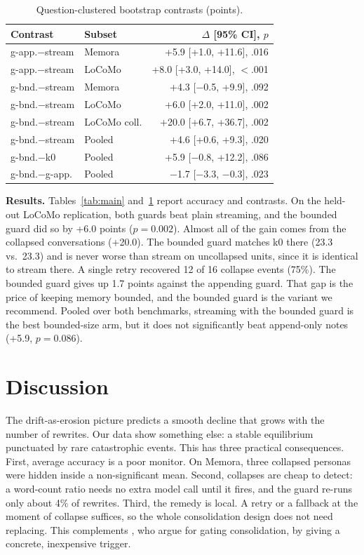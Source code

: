 \documentclass[11pt]{article}
\begin{document}
\begin{table}[t]
\centering\small
\setlength{\tabcolsep}{3pt}
\begin{tabular}{llr}
\toprule
Contrast & Subset & $\Delta$ [95\% CI], $p$ \\
\midrule
g-app.$-$stream & Memora & +5.9 [+1.0, +11.6], .016 \\
g-app.$-$stream & LoCoMo & +8.0 [+3.0, +14.0], $<$.001 \\
g-bnd.$-$stream & Memora & +4.3 [$-$0.5, +9.9], .092 \\
g-bnd.$-$stream & LoCoMo & +6.0 [+2.0, +11.0], .002 \\
g-bnd.$-$stream & LoCoMo coll. & +20.0 [+6.7, +36.7], .002 \\
g-bnd.$-$stream & Pooled & +4.6 [+0.6, +9.3], .020 \\
g-bnd.$-$k0 & Pooled & +5.9 [$-$0.8, +12.2], .086 \\
g-bnd.$-$g-app. & Pooled & $-$1.7 [$-$3.3, $-$0.3], .023 \\
\bottomrule
\end{tabular}
\caption{Question-clustered bootstrap contrasts (points).}
\label{tab:contrast}
\end{table}

\textbf{Results.} Tables~\ref{tab:main} and~\ref{tab:contrast} report accuracy and contrasts. On the held-out LoCoMo replication, both guards beat plain streaming, and the bounded guard did so by +6.0 points ($p{=}0.002$). Almost all of the gain comes from the collapsed conversations (+20.0). The bounded guard matches k0 there (23.3 vs.\ 23.3) and is never worse than stream on uncollapsed units, since it is identical to stream there. A single retry recovered 12 of 16 collapse events (75\%). The bounded guard gives up 1.7 points against the appending guard. That gap is the price of keeping memory bounded, and the bounded guard is the variant we recommend. Pooled over both benchmarks, streaming with the bounded guard is the best bounded-size arm, but it does not significantly beat append-only notes (+5.9, $p{=}0.086$).

\section{Discussion}
The drift-as-erosion picture predicts a smooth decline that grows with the number of rewrites. Our data show something else: a stable equilibrium punctuated by rare catastrophic events. This has three practical consequences. First, average accuracy is a poor monitor. On Memora, three collapsed personas were hidden inside a non-significant mean. Second, collapses are cheap to detect: a word-count ratio needs no extra model call until it fires, and the guard re-runs only about 4\% of rewrites. Third, the remedy is local. A retry or a fallback at the moment of collapse suffices, so the whole consolidation design does not need replacing. This complements \citet{zhang2026faulty}, who argue for gating consolidation, by giving a concrete, inexpensive trigger.
\end{document}
